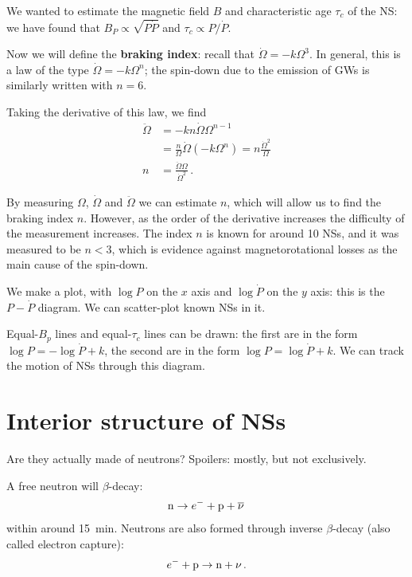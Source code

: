 \documentclass[main.tex]{subfiles}
\begin{document}

We wanted to estimate the magnetic field \(B\) and characteristic age \(\tau _c\) of the NS: we have found that \(B_P \propto \sqrt{P \dot{P}}\) and \(\tau _c \propto P / \dot{P}\).

Now we will define the \textbf{braking index}: recall that \(\dot{\Omega} = - k \Omega^3\). 
In general, this is a law of the type \(\dot{\Omega} = -k \Omega^{n}\); the spin-down due to the emission of GWs is similarly written with \(n = 6\). 

Taking the derivative of this law, we find 
%
\begin{align}
\ddot{\Omega} &= - kn \dot{\Omega} \Omega^{n-1}  \\
&= \frac{n}{\Omega } \dot{\Omega} (-k \Omega^{n}) = n \frac{\dot{\Omega}^2}{\Omega }   \\
n &= \frac{\ddot{\Omega} \Omega }{\dot{\Omega}^2}
\,.
\end{align}

By measuring \(\Omega \), \(\dot{\Omega}\) and \(\ddot{\Omega}\) we can estimate \(n\), which will allow us to find the braking index \(n\).
However, as the order of the derivative increases the difficulty of the measurement increases. The index \(n\) is known for around 10 NSs, and it was measured to be \(n < 3\), which is evidence against magnetorotational losses as the main cause of the spin-down. 

We make a plot, with  \(\log P\) on the \(x\) axis and \(\log \dot{P}\) on the \(y\) axis: this is the \(P-\dot{P}\) diagram.
We can scatter-plot known NSs in it. 

Equal-\(B_p\) lines and equal-\(\tau _c\) lines can be drawn: 
the first are in the form \(\log P = - \log \dot{P} + k\), the second are in the form \(\log P = \log \dot{P} + k\). 
We can track the motion of NSs through this diagram. 

\section{Interior structure of NSs}

Are they actually made of neutrons? Spoilers: mostly, but not exclusively.

A free neutron will \(\beta \)-decay:  
%
\begin{align}
\ce{n} \to e^{-} + \ce{p} + \overline{\nu}
\,
\end{align}
%
within around \SI{15}{min}. Neutrons are also formed through inverse \(\beta \)-decay (also called electron capture): 
%
\begin{align}
e^{-} + \ce{p} \to \ce{n} + \nu 
\,.
\end{align}
\end{document}
